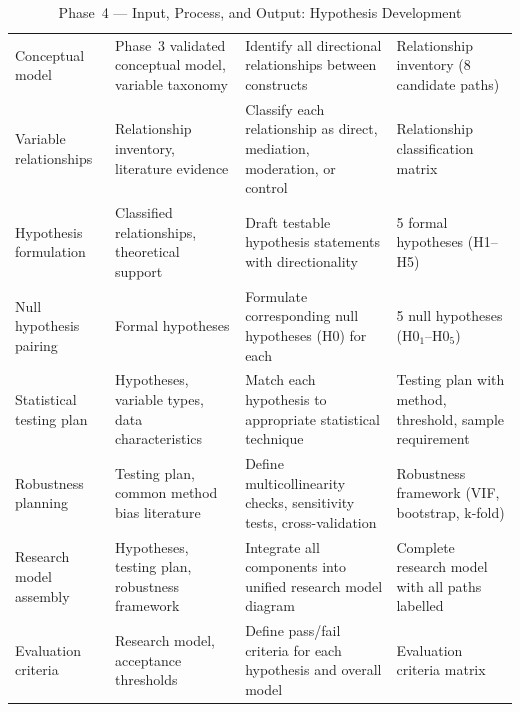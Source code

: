 \begin{xltabular}{\textwidth}{@{} l X X X @{}}
\caption{Phase~4 --- Input, Process, and Output: Hypothesis Development}
\label{tab:phase4_ipo}\\
\toprule
{} &  &  &  \\
\midrule
\endfirsthead
\endhead
\bottomrule
\endlastfoot
Conceptual model         & Phase~3 validated conceptual model, variable taxonomy          & Identify all directional relationships between constructs          & Relationship inventory (8 candidate paths) \\
\addlinespace
Variable relationships   & Relationship inventory, literature evidence                     & Classify each relationship as direct, mediation, moderation, or control & Relationship classification matrix \\
\addlinespace
Hypothesis formulation   & Classified relationships, theoretical support                   & Draft testable hypothesis statements with directionality           & 5 formal hypotheses (H1--H5) \\
\addlinespace
Null hypothesis pairing  & Formal hypotheses                                              & Formulate corresponding null hypotheses (H0) for each             & 5 null hypotheses (H0$_1$--H0$_5$) \\
\addlinespace
Statistical testing plan & Hypotheses, variable types, data characteristics               & Match each hypothesis to appropriate statistical technique         & Testing plan with method, threshold, sample requirement \\
\addlinespace
Robustness planning      & Testing plan, common method bias literature                    & Define multicollinearity checks, sensitivity tests, cross-validation & Robustness framework (VIF, bootstrap, k-fold) \\
\addlinespace
Research model assembly  & Hypotheses, testing plan, robustness framework                 & Integrate all components into unified research model diagram       & Complete research model with all paths labelled \\
\addlinespace
Evaluation criteria      & Research model, acceptance thresholds                          & Define pass/fail criteria for each hypothesis and overall model    & Evaluation criteria matrix \\
\end{xltabular}
\endgroup

\vspace{1.5em}

